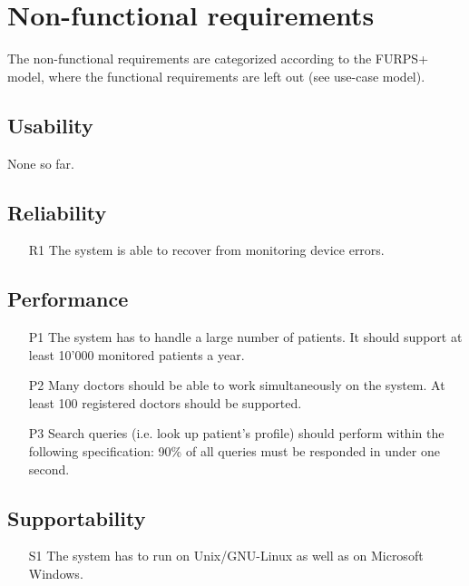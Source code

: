\documentclass[fontsize=12pt,
               paper=a4,
               twoside=false,
               parskip=half,
               ]{scrartcl}
\begin{document}
\newcommand{\doctitle}{Supplementary Specification}
\newcommand{\docrevision}{45}


\tableofcontents

\section{Non-functional requirements}

The non-functional requirements are categorized according to the FURPS+ model, where the functional requirements are left out (see use-case model).

\subsection{Usability}

None so far.

\subsection{Reliability}

\begin{itemize}
	\item[R1] The system is able to recover from monitoring device errors.
\end{itemize}

\subsection{Performance}

\begin{itemize}
	\item[P1] The system has to handle a large number of patients. It should support at least 10'000 monitored patients a year.
	\item[P2] Many doctors should be able to work simultaneously on the system. At least 100 registered doctors should be supported.
	\item[P3] Search queries (i.e. look up patient's profile) should perform within the following specification: 90\% of all queries must be responded in under one second.
\end{itemize}

\subsection{Supportability}

\begin{itemize}
	\item[S1] The system has to run on Unix/GNU-Linux as well as on Microsoft Windows.
\end{itemize}
\end{document}
